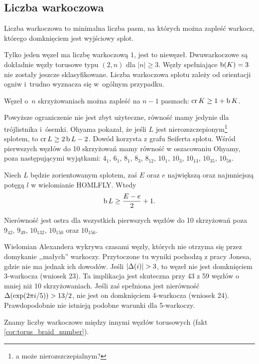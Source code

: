 
\subsection{Liczba warkoczowa} %

\begin{definition}
\label{def:braid_number}%
    Liczba warkoczowa to minimalna liczba pasm, na których można zapleść warkocz, którego domknięciem jest wyjściowy splot.
\end{definition}

Tylko jeden węzeł ma liczbę warkoczową $1$, jest to niewęzeł.
Dwuwarkoczowe są dokładnie węzły torusowe typu $(2, n)$ dla $|n| \ge 3$.
Węzły spełniające $\operatorname{b} (K) = 3$ nie zostały jeszcze sklasyfikowane.
Liczba warkoczowa splotu zależy od orientacji ogniw i~trudno wyznacza się w~ogólnym przypadku.

\begin{proposition}
    Węzeł o~$n$ skrzyżowaniach można zapleść na $n - 1$ pasmach: $\operatorname{cr} K \ge 1 + \operatorname{b} K$.
\end{proposition}

Powyższe ograniczenie nie jest zbyt użyteczne, równość mamy jedynie dla trójlistnika i~ósemki.
Ohyama pokazał, że jeśli $L$ jest nierozszczepionym\footnote{a może nierozszczepialnym?} splotem, to $\operatorname{cr} L \ge 2 \operatorname{b} L - 2$.
Dowód korzysta z grafu Seiferta splotu.
Wśród pierwszych węzłów do 10 skrzyżowań mamy równość w oszacowaniu Ohyamy, poza następującymi wyjątkami: $4_1$, $6_1$, $8_1$, $8_3$, $8_{12}$, $10_1$, $10_3$, $10_{13}$, $10_{35}$, $10_{58}$.

\begin{proposition}
    Niech $L$ będzie zorientowanym splotem, zaś $E$ oraz $e$ największą oraz najmniejszą potęgą $l$ w wielomianie HOMLFLY.
    Wtedy
    \begin{equation}
        \operatorname{b} L \ge \frac{E-e}{2} + 1.
    \end{equation}
\end{proposition}

Nierówność jest ostra dla wszystkich pierwszych węzłów do 10 skrzyżowań poza $9_{42}$, $9_{49}$, $10_{132}$, $10_{150}$ oraz $10_{156}$.

Wielomian Alexandera wykrywa czasami węzły, których nie otrzyma się przez domykanie ,,małych'' warkoczy.
Przytoczone tu wyniki pochodzą z pracy \cite{jones85} Jonesa, gdzie nie ma jednak ich dowodów.
Jeśli $|\Delta(i)| > 3$, to węzeł nie jest domknięciem 3-warkocza (wniosek 23).
Ta implikacja jest skuteczna przy 43 z 59 węzłów o mniej niż 10 skrzyżowaniach.
Jeśli zaś spełniona jest nierówność $\Delta (\exp (2\pi i / 5)) > 13/2$, nie jest on domknięciem 4-warkocza (wniosek 24).
Prawdopodobnie nie istnieją podobne warunki dla 5-warkoczy.

Znamy liczby warkoczowe między innymi węzłów torusowych (fakt \ref{cor:torus_braid_number}).



